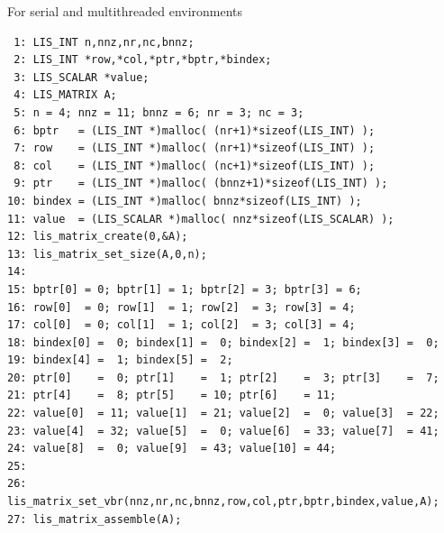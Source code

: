 \documentclass[a4paper]{article}
\begin{document}
\begin{itemsquarebox}[l]{For serial and multithreaded environments}
\small
\begin{verbatim}
 1: LIS_INT n,nnz,nr,nc,bnnz;
 2: LIS_INT *row,*col,*ptr,*bptr,*bindex;
 3: LIS_SCALAR *value;
 4: LIS_MATRIX A;
 5: n = 4; nnz = 11; bnnz = 6; nr = 3; nc = 3;
 6: bptr   = (LIS_INT *)malloc( (nr+1)*sizeof(LIS_INT) );
 7: row    = (LIS_INT *)malloc( (nr+1)*sizeof(LIS_INT) );
 8: col    = (LIS_INT *)malloc( (nc+1)*sizeof(LIS_INT) );
 9: ptr    = (LIS_INT *)malloc( (bnnz+1)*sizeof(LIS_INT) );
10: bindex = (LIS_INT *)malloc( bnnz*sizeof(LIS_INT) );
11: value  = (LIS_SCALAR *)malloc( nnz*sizeof(LIS_SCALAR) );
12: lis_matrix_create(0,&A);
13: lis_matrix_set_size(A,0,n);
14:
15: bptr[0] = 0; bptr[1] = 1; bptr[2] = 3; bptr[3] = 6;
16: row[0]  = 0; row[1]  = 1; row[2]  = 3; row[3] = 4;
17: col[0]  = 0; col[1]  = 1; col[2]  = 3; col[3] = 4;
18: bindex[0] =  0; bindex[1] =  0; bindex[2] =  1; bindex[3] =  0;
19: bindex[4] =  1; bindex[5] =  2;
20: ptr[0]    =  0; ptr[1]    =  1; ptr[2]    =  3; ptr[3]    =  7;
21: ptr[4]    =  8; ptr[5]    = 10; ptr[6]    = 11;
22: value[0]  = 11; value[1]  = 21; value[2]  =  0; value[3]  = 22;
23: value[4]  = 32; value[5]  =  0; value[6]  = 33; value[7]  = 41;
24: value[8]  =  0; value[9]  = 43; value[10] = 44;
25:
26: lis_matrix_set_vbr(nnz,nr,nc,bnnz,row,col,ptr,bptr,bindex,value,A);
27: lis_matrix_assemble(A);
\end{verbatim}
\end{itemsquarebox}

\newpage
\end{document}

